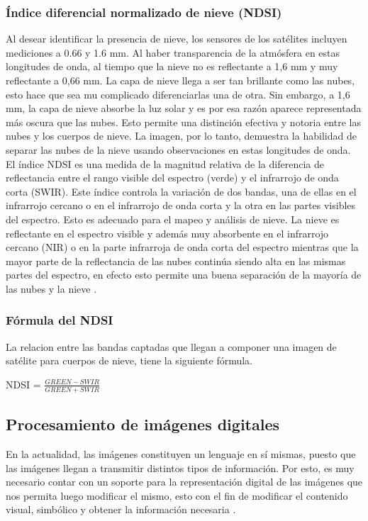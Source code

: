 	\subsubsection{Índice diferencial normalizado de nieve (NDSI)}
	Al desear identificar la presencia de nieve, los sensores de los satélites incluyen mediciones a 0.66 y 1.6 mm. Al haber transparencia de la atmósfera en estas longitudes de onda, al tiempo que la nieve no es reflectante a 1,6 mm y muy reflectante a 0,66 mm.
	La capa de nieve llega a ser tan brillante como las nubes, esto hace que sea mu complicado diferenciarlas una de otra. Sin embargo, a 1,6 mm, la capa de nieve absorbe la luz solar y es por esa razón aparece representada más oscura que las nubes. Esto permite una distinción efectiva y notoria entre las nubes y los cuerpos de nieve. La imagen, por lo tanto, demuestra la habilidad de separar las nubes de la nieve usando observaciones en estas longitudes de onda. 
	El índice NDSI es una medida de la magnitud relativa de la diferencia de reflectancia entre el rango visible del espectro (verde) y el infrarrojo de onda corta (SWIR). Este índice controla la variación de dos bandas, una de ellas en el infrarrojo cercano o en el infrarrojo de onda corta y la otra en las partes visibles del espectro. Esto es adecuado para el mapeo y análisis de nieve. La nieve es reflectante en el espectro visible y además muy absorbente en el infrarrojo cercano (NIR) o en la parte infrarroja de onda corta del espectro mientras que la mayor parte de la reflectancia de las nubes continúa siendo alta en las mismas partes del espectro, en efecto esto permite una buena separación de la mayoría de las nubes y la nieve \parencite{eos}.
	
	\subsubsection{Fórmula del NDSI}
	La relacion entre las bandas captadas que llegan a componer una imagen de satélite para cuerpos de nieve, tiene la siguiente fórmula.
	
	NDSI = \(\frac{GREEN - SWIR}{GREEN + SWIR}\)
	
	\subsection{Procesamiento de imágenes digitales}
	
	En la actualidad, las imágenes constituyen un lenguaje en sí mismas, puesto que las imágenes llegan a transmitir distintos tipos de información. Por esto, es muy necesario contar con un soporte para la representación digital de las imágenes que nos permita luego modificar el mismo, esto con el fin de modificar el contenido visual, simbólico y obtener la información necesaria \parencite{jahne2005digital}.

